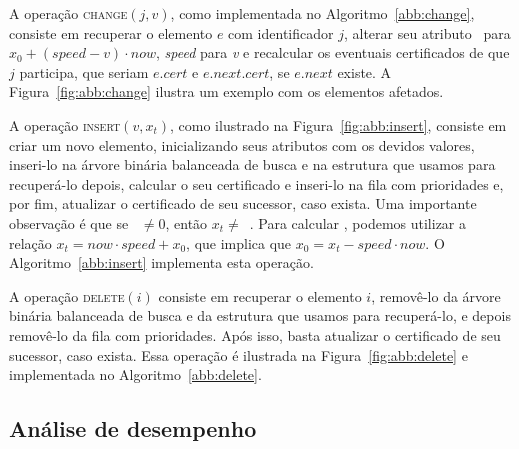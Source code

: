 





A operação \textsc{change}$(j, v)$, como implementada no Algoritmo~\ref{abb:change}, consiste em
recuperar o elemento $e$ com identificador $j$, alterar seu atributo \initv~para $x_0 +
(\mathit{speed} - v)\cdot now$, \textit{speed} para \textit{v} e
recalcular os eventuais certificados de que $j$ participa, que
seriam $e.cert$ e $e.next.cert$, se $e.next$ existe.
A Figura~\ref{fig:abb:change} ilustra um exemplo com os elementos afetados.







A operação \textsc{insert}$(v, x_t)$, como ilustrado na Figura~\ref{fig:abb:insert}, consiste em
criar um novo elemento, inicializando seus atributos com os devidos valores, inseri-lo na
árvore binária balanceada de busca e na estrutura que usamos para
recuperá-lo depois, calcular o seu certificado e inseri-lo na fila
com prioridades e, por fim, atualizar o certificado de seu sucessor,
caso exista.
Uma importante observação é que se \now~$\neq 0$, então $x_t \neq$~\initv.
Para calcular \initv, podemos utilizar a relação
${x_t = now\cdot speed + x_0}$, que implica que ${x_0 = x_t -
speed\cdot now}$.
O Algoritmo~\ref{abb:insert} implementa esta operação.





A operação \textsc{delete}$(i)$ consiste em recuperar o elemento
$i$, removê-lo da árvore binária balanceada de busca e da estrutura
que usamos para recuperá-lo, e depois removê-lo da fila com
prioridades.
Após isso, basta atualizar o certificado de seu sucessor, caso exista.
Essa operação é ilustrada na Figura~\ref{fig:abb:delete} e implementada no
Algoritmo~\ref{abb:delete}.



\FloatBarrier

\subsection{Análise de desempenho}\label{subsec:analise-de-desempenho-abb}

